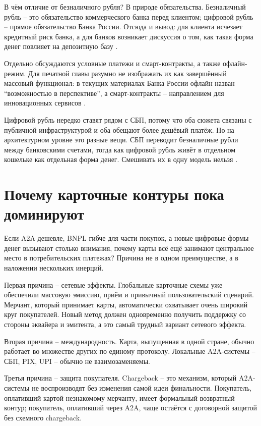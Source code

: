 В чём отличие от безналичного рубля? В природе обязательства. Безналичный
рубль -- это обязательство коммерческого банка перед клиентом; цифровой
рубль -- прямое обязательство Банка России. Отсюда и вывод: для клиента
исчезает кредитный риск банка, а для банков возникает дискуссия о том,
как такая форма денег повлияет на депозитную базу \cite{cbr-digital-ruble}.

Отдельно обсуждаются условные платежи и смарт-контракты, а также
офлайн-режим. Для печатной главы разумно не изображать их как завершённый
массовый функционал: в текущих материалах Банка России офлайн назван
\enquote{возможностью в перспективе}, а смарт-контракты -- направлением
для инновационных сервисов \cite{cbr-digital-ruble}.

Цифровой рубль нередко ставят рядом с СБП, потому что оба сюжета
связаны с публичной инфраструктурой и оба обещают более дешёвый
платёж. Но на архитектурном уровне это разные вещи. СБП переводит
безналичные рубли между банковскими счетами, тогда как цифровой рубль
живёт в отдельном кошельке как отдельная форма денег. Смешивать их
в одну модель нельзя \cite{cbr-digital-ruble}.

\section{Почему карточные контуры пока доминируют}
\label{sec:alt-card-dominance}

Если A2A дешевле, BNPL гибче для части покупок, а новые цифровые формы
денег вызывают столько внимания, почему карты всё ещё занимают
центральное место в потребительских платежах? Причина не в одном
преимуществе, а в наложении нескольких инерций.

Первая причина -- сетевые эффекты. Глобальные карточные схемы уже
обеспечили массовую эмиссию, приём и привычный пользовательский сценарий.
Мерчант, который принимает карты, автоматически охватывает очень широкий круг
покупателей. Новый метод должен одновременно получить поддержку
со стороны эквайера и эмитента, а это самый трудный вариант сетевого
эффекта.

Вторая причина -- международность. Карта, выпущенная в одной стране,
обычно работает во множестве других по единому протоколу. Локальные
A2A-системы -- СБП, PIX, UPI -- обычно не взаимозаменяемы.

Третья причина -- защита покупателя. Chargeback -- это механизм, который
A2A-системы не воспроизводят без изменения самой идеи финальности.
Покупатель, оплативший картой незнакомому мерчанту, имеет формальный
возвратный контур; покупатель, оплативший через A2A, чаще остаётся с
договорной защитой без схемного chargeback.

